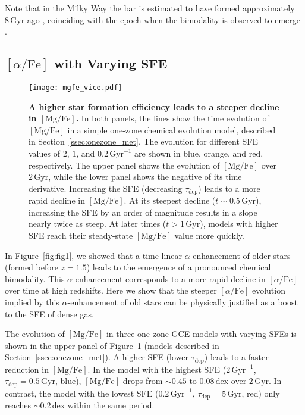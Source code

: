 \documentclass[twocolumn]{aastex631}
\newcommand{\Gyr}{\ensuremath{\textrm{Gyr}}}
\newcommand{\MgFe}{\ensuremath{[\textrm{Mg}/\textrm{Fe}]}}
\newcommand{\alphaFe}{\ensuremath{[\alpha/\textrm{Fe}]}}
\newcommand{\dex}{\ensuremath{\textrm{dex}}}
\begin{document}
Note that in the Milky Way the bar is estimated to have formed approximately $8\,\Gyr$ ago \citep{2019MNRAS.490.4740B,2024MNRAS.530.2972S}, coinciding with the epoch when the bimodality is observed to emerge \citep{2013A&A...560A.109H,2023MNRAS.525.2208R,2024MNRAS.535..392L}.

\subsection{\alphaFe{} with Varying SFE}\label{ssec:onezone}

\begin{figure}
  \centering
  \texttt{[image: mgfe\_vice.pdf]}
  \caption{\textbf{A higher star formation efficiency leads to a steeper decline in \MgFe{}.} In both panels, the lines show the time evolution of \MgFe{} in a simple one-zone chemical evolution model, described in Section~\ref{ssec:onezone_met}. The evolution for different SFE values of $2$, $1$, and $0.2\,\textrm{Gyr}^{-1}$ are shown in blue, orange, and red, respectively.  The upper panel shows the evolution of \MgFe{} over $2\,\Gyr$, while the lower panel shows the negative of its time derivative. Increasing the SFE (decreasing $\tau_{\textrm{dep}}$) leads to a more rapid decline in \MgFe{}. At its steepest decline ($t\sim0.5\,\Gyr$), increasing the SFE by an order of magnitude results in a slope nearly twice as steep. At later times ($t > 1\,\Gyr$), models with higher SFE reach their steady-state \MgFe{} value more quickly.}
  \label{fig:vice}
\end{figure}

In Figure~\ref{fig:fig1}, we showed that a time-linear $\alpha$-enhancement of older stars (formed before $z=1.5$) leads to the emergence of a pronounced chemical bimodality. This $\alpha$-enhancement corresponds to a more rapid decline in \alphaFe{} over time at high redshifts. Here we show that the steeper \alphaFe{} evolution implied by this $\alpha$-enhancement of old stars can be physically justified as a boost to the SFE of dense gas.

The evolution of \MgFe{} in three one-zone GCE models with varying SFEs is shown in the upper panel of Figure~\ref{fig:vice} (models described in Section~\ref{ssec:onezone_met}). A higher SFE (lower $\tau_{\textrm{dep}}$) leads to a faster reduction in \MgFe{}. In the model with the highest SFE ($2\,\Gyr^{-1}$, $\tau_{\textrm{dep}}=0.5\,\Gyr$, blue), \MgFe{} drops from $\sim0.45$ to $0.08\,\dex$ over $2\,\Gyr$. In contrast, the model with the lowest SFE ($0.2\,\Gyr^{-1}$, $\tau_{\textrm{dep}}=5\,\Gyr$, red) only reaches $\sim0.2\,\dex$ within the same period.
\end{document}
